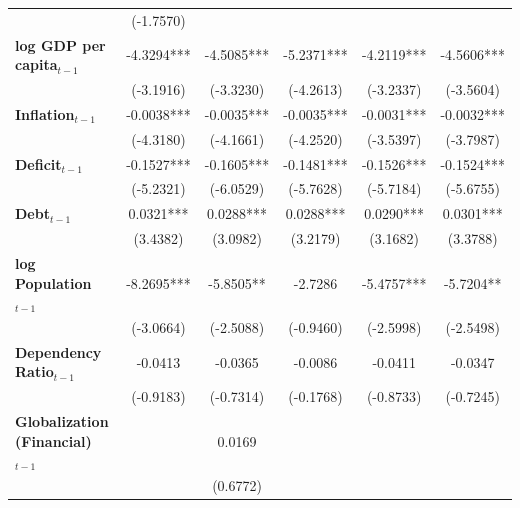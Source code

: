 \begin{center}
\begin{tabular}{lccccc}
\textbf{ }                         &    (-1.7570)     &                  &                  &                  &                   \\
\textbf{log GDP per capita$_{t-1}$}           &    -4.3294***    &    -4.5085***    &    -5.2371***    &    -4.2119***    &    -4.5606***     \\
\textbf{ }                         &    (-3.1916)     &    (-3.3230)     &    (-4.2613)     &    (-3.2337)     &    (-3.5604)      \\
\textbf{Inflation$_{t-1}$}      &    -0.0038***    &    -0.0035***    &    -0.0035***    &    -0.0031***    &    -0.0032***     \\
\textbf{ }                         &    (-4.3180)     &    (-4.1661)     &    (-4.2520)     &    (-3.5397)     &    (-3.7987)      \\
\textbf{Deficit$_{t-1}$}             &    -0.1527***    &    -0.1605***    &    -0.1481***    &    -0.1526***    &    -0.1524***     \\
\textbf{ }                         &    (-5.2321)     &    (-6.0529)     &    (-5.7628)     &    (-5.7184)     &    (-5.6755)      \\
\textbf{Debt$_{t-1}$}                &    0.0321***     &    0.0288***     &    0.0288***     &    0.0290***     &    0.0301***      \\
\textbf{ }                         &     (3.4382)     &     (3.0982)     &     (3.2179)     &     (3.1682)     &     (3.3788)      \\
\textbf{log Population$_{t-1}$}      &    -8.2695***    &    -5.8505**     &     -2.7286      &    -5.4757***    &    -5.7204**      \\
\textbf{ }                         &    (-3.0664)     &    (-2.5088)     &    (-0.9460)     &    (-2.5998)     &    (-2.5498)      \\
\textbf{Dependency Ratio$_{t-1}$}   &     -0.0413      &     -0.0365      &     -0.0086      &     -0.0411      &     -0.0347       \\
\textbf{ }                         &    (-0.9183)     &    (-0.7314)     &    (-0.1768)     &    (-0.8733)     &    (-0.7245)      \\
\textbf{Globalization (Financial)$_{t-1}$}             &                  &      0.0169      &                  &                  &                   \\
\textbf{ }                         &                  &     (0.6772)     &                  &                  &                   \\

\end{tabular}
\end{center}
